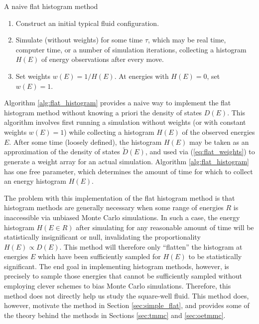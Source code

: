 \documentclass[11pt]{article}
\newcommand{\p}[1]{\left(#1\right)} %
\newenvironment{alg}
{\hrulefill\begin{enumerate}}
{\end{enumerate}\hrulefill}
\begin{document}
\begin{algorithm}[b]
  \caption{A naive flat histogram method}
  \label{alg:flat_histogram}
  \begin{alg}

  \item Construct an initial typical fluid configuration.

  \item Simulate (without weights) for some time $\tau$, which may be
    real time, computer time, or a number of simulation iterations,
    collecting a histogram $H\p{E}$ of energy observations after every
    move.

  \item Set weights $w\p{E}=1/H\p{E}$. At energies with $H\p{E}=0$,
    set $w\p{E}=1$.

  \end{alg}
\end{algorithm}

Algorithm \ref{alg:flat_histogram} provides a naive way to implement
the flat histogram method without knowing a priori the density of
states $D\p{E}$. This algorithm involves first running a simulation
without weights (or with constant weights $w\p{E}=1$) while collecting
a histogram $H\p{E}$ of the observed energies $E$. After some time
(loosely defined), the histogram $H\p{E}$ may be taken as an
approximation of the density of states $\tilde D\p{E}$, and used via
(\ref{eq:flat_weights}) to generate a weight array for an actual
simulation. Algorithm \ref{alg:flat_histogram} has one free parameter,
which determines the amount of time for which to collect an energy
histogram $H\p{E}$.

The problem with this implementation of the flat histogram method is
that histogram methods are generally necessary when some range of
energies $R$ is inaccessible via unbiased Monte Carlo simulations. In
such a case, the energy histogram $H\p{E\in R}$ after simulating for
any reasonable amount of time will be statistically insignificant or
null, invalidating the proportionality $H\p{E}\propto D\p{E}$. This
method will therefore only ``flatten'' the histogram at energies $E$
which have been sufficiently sampled for $H\p{E}$ to be statistically
significant. The end goal in implementing histogram methods, however,
is precisely to sample those energies that cannot be sufficiently
sampled without employing clever schemes to bias Monte Carlo
simulations. Therefore, this method does not directly help us study
the square-well fluid. This method does, however, motivate the method
in Section \ref{sec:simple_flat}, and provides some of the theory
behind the methods in Sections \ref{sec:tmmc} and \ref{sec:oetmmc}.
\end{document}
